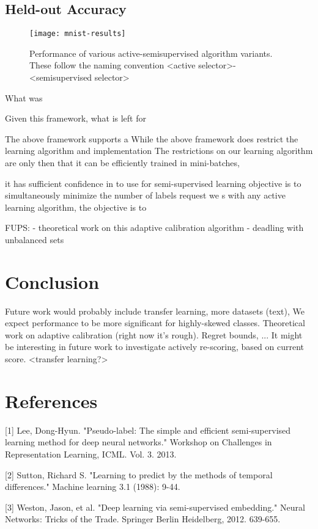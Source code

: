 \documentclass{article}
\begin{document}
\subsection{Held-out Accuracy}
\begin{figure}[h]
  \center 
  \texttt{[image: mnist-results]}
  \caption{Performance of various active-semisupervised algorithm variants.  These follow the naming convention <active selector>-<semisupervised selector>}
\end{figure}

What was 


Given this framework, what is left for 

The above framework supports a
While the above framework does restrict the learning algorithm and implementation
The restrictions on our learning algorithm are only then that it can be efficiently trained in mini-batches, 

it has sufficient confidence in to use for semi-supervised learning
objective is to simultaneously minimize the number of labels request
we s with any active learning algorithm, the objective is to 

FUPS: 
- theoretical work on this adaptive calibration algorithm
- deadling with unbalanced sets

\section{Conclusion}
Future work would probably include transfer learning, more datasets (text), 
We expect performance to be more significant for highly-skewed classes.  
Theoretical work on adaptive calibration (right now it's rough).  Regret bounds, ...
It might be interesting in future work to investigate actively re-scoring, based on current score.  
<transfer learning?>
\section*{References}

\small

[1] Lee, Dong-Hyun. "Pseudo-label: The simple and efficient semi-supervised learning method for deep neural networks." Workshop on Challenges in Representation Learning, ICML. Vol. 3. 2013.

[2] Sutton, Richard S. "Learning to predict by the methods of temporal differences." Machine learning 3.1 (1988): 9-44.

[3] Weston, Jason, et al. "Deep learning via semi-supervised embedding." Neural Networks: Tricks of the Trade. Springer Berlin Heidelberg, 2012. 639-655.
\end{document}
